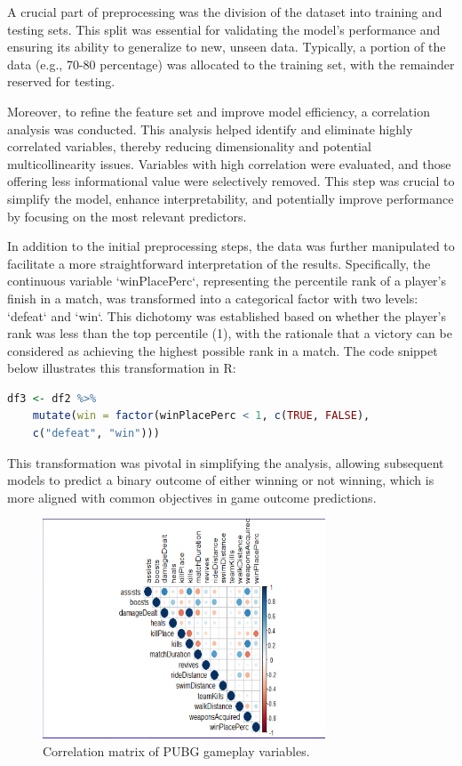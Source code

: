 \documentclass[12pt]{article}
\begin{document}
A crucial part of preprocessing was the division of the dataset into training and testing sets. This split was essential for validating the model's performance and ensuring its ability to generalize to new, unseen data. Typically, a portion of the data (e.g., 70-80 percentage) was allocated to the training set, with the remainder reserved for testing.

Moreover, to refine the feature set and improve model efficiency, a correlation analysis was conducted. This analysis helped identify and eliminate highly correlated variables, thereby reducing dimensionality and potential multicollinearity issues. Variables with high correlation were evaluated, and those offering less informational value were selectively removed. This step was crucial to simplify the model, enhance interpretability, and potentially improve performance by focusing on the most relevant predictors.

In addition to the initial preprocessing steps, the data was further manipulated to facilitate a more straightforward interpretation of the results. Specifically, the continuous variable `winPlacePerc`, representing the percentile rank of a player's finish in a match, was transformed into a categorical factor with two levels: `defeat` and `win`. This dichotomy was established based on whether the player's rank was less than the top percentile (1), with the rationale that a victory can be considered as achieving the highest possible rank in a match. The code snippet below illustrates this transformation in R:

\begin{lstlisting}[language=R, caption=Creating a binary outcome variable]
	df3 <- df2 %>%
	mutate(win = factor(winPlacePerc < 1, c(TRUE, FALSE), 
	c("defeat", "win")))
\end{lstlisting}

This transformation was pivotal in simplifying the analysis, allowing subsequent models to predict a binary outcome of either winning or not winning, which is more aligned with common objectives in game outcome predictions.


\begin{figure}[h]
	\centering
	\includegraphics[width=0.75\textwidth]{Correlation.png} 
	\caption{Correlation matrix of PUBG gameplay variables.}
	\label{fig:correlation_matrix}
\end{figure}
\end{document}
